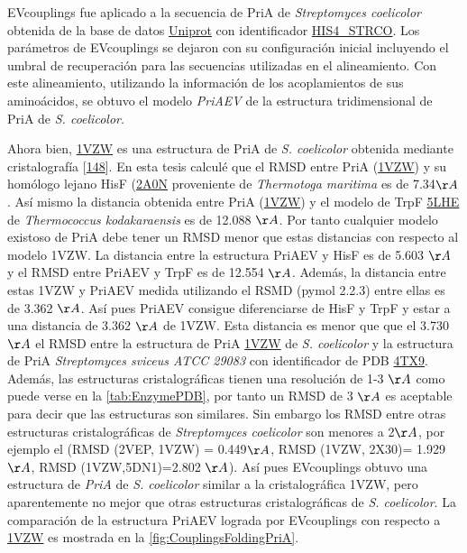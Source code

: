 \documentclass[12pt,twoside]{reedthesis}
\begin{document}
  EVcouplings fue aplicado a la secuencia de PriA de \emph{Streptomyces
  coelicolor} obtenida de la base de datos
  \href{https://www.uniprot.org/}{Uniprot} con identificador
  \href{https://www.uniprot.org/uniprot/P16250}{HIS4\_STRCO}. Los
  parámetros de EVcouplings se dejaron con su configuración inicial
  incluyendo el umbral de recuperación para las secuencias utilizadas en
  el alineamiento. Con este alineamiento, utilizando la información de los
  acoplamientos de sus aminoácidos, se obtuvo el modelo \emph{PriAEV} de
  la estructura tridimensional de PriA de \emph{S. coelicolor}.
  
  Ahora bien, \href{https://www.rcsb.org/structure/1vzw}{1VZW} es una
  estructura de PriA de \emph{S. coelicolor} obtenida mediante
  cristalografía {[}\protect\hyperlink{ref-kuper_twofold_2005}{148}{]}. En
  esta tesis calculé que el RMSD entre PriA
  (\href{https://www.rcsb.org/structure/1vzw}{1VZW}) y su homólogo lejano
  HisF (\href{http://www.rcsb.org/structure/2A0N}{2A0N} proveniente de
  \emph{Thermotoga maritima} es de 7.34\({\AA}\). Así mismo la distancia
  obtenida entre PriA (\href{https://www.rcsb.org/structure/1vzw}{1VZW}) y
  el modelo de TrpF \href{http://www.rcsb.org/structure/5LHE}{5LHE} de
  \emph{Thermococcus kodakaraensis} es de 12.088 \({\AA}\). Por tanto
  cualquier modelo existoso de PriA debe tener un RMSD menor que estas
  distancias con respecto al modelo 1VZW. La distancia entre la estructura
  PriAEV y HisF es de 5.603 \({\AA}\) y el RMSD entre PriAEV y TrpF es de
  12.554 \({\AA}\). Además, la distancia entre estas 1VZW y PriAEV medida
  utilizando el RSMD (pymol 2.2.3) entre ellas es de 3.362 \({\AA}\). Así
  pues PriAEV consigue diferenciarse de HisF y TrpF y estar a una
  distancia de 3.362 \({\AA}\) de 1VZW. Esta distancia es menor que que el
  3.730 \({\AA}\) el RMSD entre la estructura de PriA
  \href{https://www.rcsb.org/structure/1vzw}{1VZW} de \emph{S. coelicolor}
  y la estructura de PriA \emph{Streptomyces sviceus ATCC 29083} con
  identificador de PDB \href{https://www.rcsb.org/structure/4TX9}{4TX9}.
  Además, las estructuras cristalográficas tienen una resolución de 1-3
  \({\AA}\) como puede verse en la \autoref{tab:EnzymePDB}, por tanto un
  RMSD de 3 \({\AA}\) es aceptable para decir que las estructuras son
  similares. Sin embargo los RMSD entre otras estructuras cristalográficas
  de \emph{Streptomyces coelicolor} son menores a 2\({\AA}\), por ejemplo
  el (RMSD (2VEP, 1VZW) = 0.449\({\AA}\), RMSD (1VZW, 2X30)= 1.929
  \({\AA}\), RMSD (1VZW,5DN1)=2.802 \({\AA}\)). Así pues EVcouplings
  obtuvo una estructura de \emph{PriA} de \emph{S. coelicolor} similar a
  la cristalográfica 1VZW, pero aparentemente no mejor que otras
  estructuras cristalográficas de \emph{S. coelicolor}. La comparación de
  la estructura PriAEV lograda por EVcouplings con respecto a
  \href{https://www.rcsb.org/structure/1vzw}{1VZW} es mostrada en la
  \autoref{fig:CouplingsFoldingPriA}.
  
\end{document}
